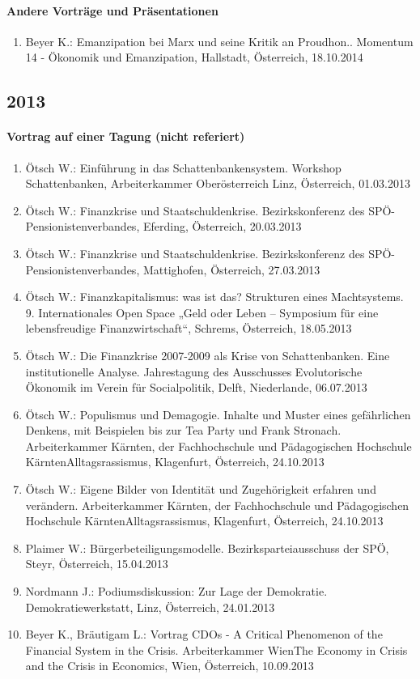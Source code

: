 \paragraph{Andere Vorträge und Präsentationen}
\begin{enumerate}
	\item Beyer K.: Emanzipation bei Marx und seine Kritik an Proudhon.. Momentum 14 - Ökonomik und Emanzipation, Hallstadt, Österreich, 18.10.2014
\end{enumerate}
\subsection*{2013}
\paragraph{Vortrag auf einer Tagung (nicht referiert)}
\begin{enumerate}
	\item Ötsch W.: Einführung in das Schattenbankensystem. Workshop Schattenbanken, Arbeiterkammer Oberösterreich Linz, Österreich, 01.03.2013
	\item Ötsch W.: Finanzkrise und Staatschuldenkrise. Bezirkskonferenz des SPÖ-Pensionistenverbandes, Eferding, Österreich, 20.03.2013
	\item Ötsch W.: Finanzkrise und Staatschuldenkrise. Bezirkskonferenz des SPÖ-Pensionistenverbandes, Mattighofen, Österreich, 27.03.2013
	\item Ötsch W.: Finanzkapitalismus: was ist das? Strukturen eines Machtsystems. 9. Internationales Open Space „Geld oder Leben – Symposium für eine lebensfreudige Finanzwirtschaft“, Schrems, Österreich, 18.05.2013
	\item Ötsch W.: Die Finanzkrise 2007-2009 als Krise von Schattenbanken. Eine institutionelle Analyse. Jahrestagung des Ausschusses Evolutorische Ökonomik im Verein für Socialpolitik, Delft, Niederlande, 06.07.2013
	\item Ötsch W.: Populismus und Demagogie. Inhalte und Muster eines gefährlichen Denkens, mit Beispielen bis zur Tea Party und Frank Stronach. Arbeiterkammer Kärnten, der Fachhochschule und Pädagogischen Hochschule KärntenAlltagsrassismus, Klagenfurt, Österreich, 24.10.2013
	\item Ötsch W.: Eigene Bilder von Identität und Zugehörigkeit erfahren und verändern. Arbeiterkammer Kärnten, der Fachhochschule und Pädagogischen Hochschule KärntenAlltagsrassismus, Klagenfurt, Österreich, 24.10.2013
	\item Plaimer W.: Bürgerbeteiligungsmodelle. Bezirksparteiausschuss der SPÖ, Steyr, Österreich, 15.04.2013
	\item Nordmann J.: Podiumsdiskussion: Zur Lage der Demokratie. Demokratiewerkstatt, Linz, Österreich, 24.01.2013
	\item Beyer K., Bräutigam L.: Vortrag CDOs - A Critical Phenomenon of the Financial System in the Crisis. Arbeiterkammer WienThe Economy in Crisis and the Crisis in Economics, Wien, Österreich, 10.09.2013
\end{enumerate}
